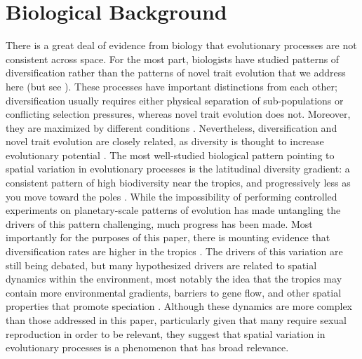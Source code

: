 \section{Biological Background}

There is a great deal of evidence from biology that evolutionary processes are not consistent across space. For the most part, biologists have studied patterns of diversification rather than the patterns of novel trait evolution that we address here (but see \citep{baym_spatiotemporal_2016}). These processes have important distinctions from each other; diversification usually requires either physical separation of sub-populations or conflicting selection pressures, whereas novel trait evolution does not. Moreover, they are maximized by different conditions \citep{walker_evolutionary_2012}. Nevertheless, diversification and novel trait evolution are closely related, as diversity is thought to increase evolutionary potential \citep{rouzic_evolutionary_2008}. The most well-studied biological pattern pointing to spatial variation in evolutionary processes is the latitudinal diversity gradient: a consistent pattern of high biodiversity near the tropics, and progressively less as you move toward the poles \citep{hillebrand_generality_2004}. While the impossibility of performing controlled experiments on planetary-scale patterns of evolution has made untangling the drivers of this pattern challenging, much progress has been made. Most importantly for the purposes of this paper, there is mounting evidence that diversification rates are higher in the tropics \citep{mittelbach_evolution_2007}. The drivers of this variation are still being debated, but many hypothesized drivers are related to spatial dynamics within the environment, most notably the idea that the tropics may contain more environmental gradients, barriers to gene flow, and other spatial properties that promote speciation \citep{moritz_diversification_2000,doebeli_speciation_2003}. Although these dynamics are more complex than those addressed in this paper, particularly given that many require sexual reproduction in order to be relevant, they suggest that spatial variation in evolutionary processes is a phenomenon that has broad relevance.
% 
%

